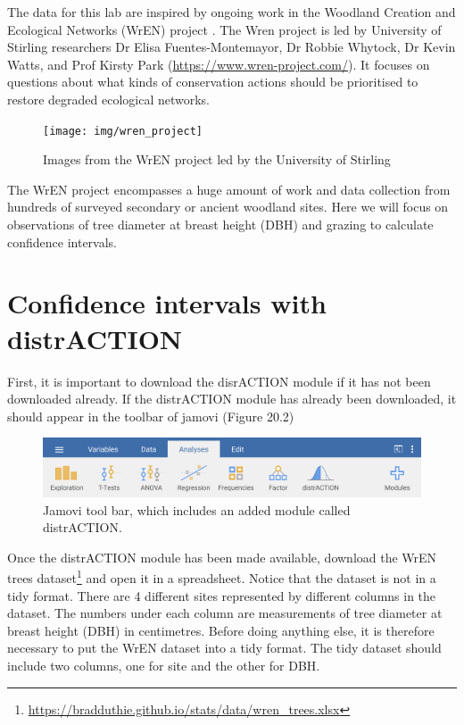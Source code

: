 \documentclass[
]{scrbook}
\begin{document}
The data for this lab are inspired by ongoing work in the Woodland Creation and Ecological Networks (WrEN) project \citep{Fuentes-Montemayor2022, Fuentes-Montemayor2022a}.
The Wren project is led by University of Stirling researchers Dr Elisa Fuentes-Montemayor, Dr Robbie Whytock, Dr Kevin Watts, and Prof Kirsty Park (\url{https://www.wren-project.com/}).
It focuses on questions about what kinds of conservation actions should be prioritised to restore degraded ecological networks.

\begin{figure}
\texttt{[image: img/wren\_project]} \caption{Images from the WrEN project led by the University of Stirling}\label{fig:unnamed-chunk-87}
\end{figure}

The WrEN project encompasses a huge amount of work and data collection from hundreds of surveyed secondary or ancient woodland sites.
Here we will focus on observations of tree diameter at breast height (DBH) and grazing to calculate confidence intervals.

\hypertarget{confidence-intervals-with-distraction}{%
\section{Confidence intervals with distrACTION}\label{confidence-intervals-with-distraction}}

First, it is important to download the disrACTION module if it has not been downloaded already.
If the distrACTION module has already been downloaded, it should appear in the toolbar of jamovi (Figure 20.2)

\begin{figure}
\includegraphics[width=1\linewidth]{img/jamovi_toolbar_modules_distrACTION} \caption{Jamovi tool bar, which includes an added module called distrACTION.}\label{fig:unnamed-chunk-88}
\end{figure}

Once the distrACTION module has been made available, download the WrEN trees dataset\footnote{\url{https://bradduthie.github.io/stats/data/wren_trees.xlsx}} and open it in a spreadsheet.
Notice that the dataset is not in a tidy format.
There are 4 different sites represented by different columns in the dataset.
The numbers under each column are measurements of tree diameter at breast height (DBH) in centimetres.
Before doing anything else, it is therefore necessary to put the WrEN dataset into a tidy format.
The tidy dataset should include two columns, one for site and the other for DBH.
\end{document}
